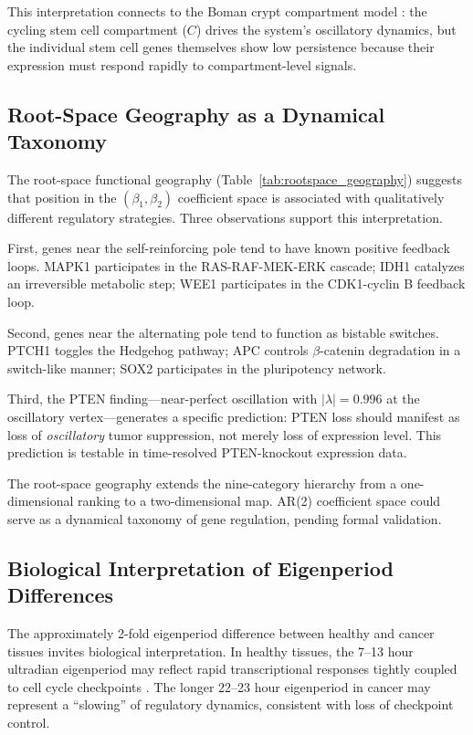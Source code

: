\documentclass[11pt,a4paper]{article}
\begin{document}
This interpretation connects to the Boman crypt compartment model \citep{boman2025}: the cycling stem cell compartment ($C$) drives the system's oscillatory dynamics, but the individual stem cell genes themselves show low persistence because their expression must respond rapidly to compartment-level signals.

\subsection{Root-Space Geography as a Dynamical Taxonomy}

The root-space functional geography (Table~\ref{tab:rootspace_geography}) suggests that position in the $(\beta_1, \beta_2)$ coefficient space is associated with qualitatively different regulatory strategies. Three observations support this interpretation.

First, genes near the self-reinforcing pole tend to have known positive feedback loops. MAPK1 participates in the RAS-RAF-MEK-ERK cascade; IDH1 catalyzes an irreversible metabolic step; WEE1 participates in the CDK1-cyclin B feedback loop.

Second, genes near the alternating pole tend to function as bistable switches. PTCH1 toggles the Hedgehog pathway; APC controls $\beta$-catenin degradation in a switch-like manner; SOX2 participates in the pluripotency network.

Third, the PTEN finding---near-perfect oscillation with $|\lambda| = 0.996$ at the oscillatory vertex---generates a specific prediction: PTEN loss should manifest as loss of \textit{oscillatory} tumor suppression, not merely loss of expression level. This prediction is testable in time-resolved PTEN-knockout expression data.

The root-space geography extends the nine-category hierarchy from a one-dimensional ranking to a two-dimensional map. AR(2) coefficient space could serve as a dynamical taxonomy of gene regulation, pending formal validation.

\subsection{Biological Interpretation of Eigenperiod Differences}

The approximately 2-fold eigenperiod difference between healthy and cancer tissues invites biological interpretation. In healthy tissues, the 7--13 hour ultradian eigenperiod may reflect rapid transcriptional responses tightly coupled to cell cycle checkpoints \citep{matsuo2003, geyfman2012brain}. The longer 22--23 hour eigenperiod in cancer may represent a ``slowing'' of regulatory dynamics, consistent with loss of checkpoint control.
\end{document}
